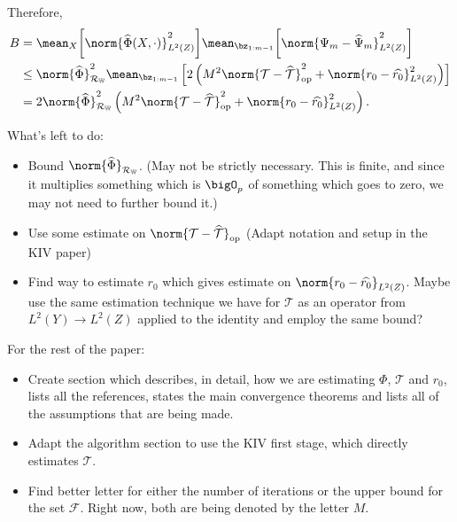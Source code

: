 \begin{itemize}
        Therefore,
        \begin{align*}
            B &= \mean_{ X } \bigg[
                \norm{ \hat{ \Phi } ( X, \cdot ) }_{ L^2 ( Z ) }^2
            \bigg]
            \mean_{ \bz_{ 1:m-1 } } \bigg[
                    \norm{ \Psi_{ m } - \hat{ \Psi }_{ m } }_{ L^2 ( Z ) }^2
            \bigg] \\
            &\leq \norm{ \hat{ \Phi } }_{ \mathcal{R}_{ \mathbb{W} } }^2
            \mean_{ \bz_{ 1:m-1 } } \left[
                2 \left(
                    M^2 \norm{ \mathcal{T} - \hat{ \mathcal{T} } }_{ \mathrm{op} }^2
                    + \norm{
                        r_{ 0 } - \hat{ r_{ 0 } }
                    }_{ L^{ 2 } ( Z ) }^2
                \right)
            \right] \\
            &= 2 \norm{ \hat{ \Phi } }_{ \mathcal{R}_{ \mathbb{W} } }^2
            \left(
                M^2 \norm{ \mathcal{T} - \hat{ \mathcal{T} } }_{ \mathrm{op} }^2
                + \norm{ r_{ 0 } - \hat{ r_{ 0 } } }_{ L^{ 2 } ( Z ) }^2
            \right)
        .\end{align*}
\end{itemize}

{\color{red}
    What's left to do:
    \begin{itemize}
        \item Bound $ \norm{ \hat{ \Phi } }_{ \mathcal{R}_{ \mathbb{W} } } $. (May not be strictly necessary. This is finite, and since it multiplies something which is $ \bigO_{ p } $ of something which goes to zero, we may not need to further bound it.) 

        \item Use some estimate on $ \norm{ \mathcal{T} - \hat{ \mathcal{T} } }_{ \mathrm{op} } $ (Adapt notation and setup in the KIV paper)

        \item Find way to estimate $ r_{ 0 } $ which gives estimate on $ \norm{ r_{ 0 } - \hat{ r_{ 0 } } }_{ L^{ 2 } ( Z ) } $.
            Maybe use the same estimation technique we have for $ \mathcal{T} $ as an operator from $ L^2 ( Y ) \to L^2 ( Z ) $ applied to the identity and employ the same bound?
    \end{itemize}
    For the rest of the paper:
    \begin{itemize}
        \item Create section which describes, in detail, how we are estimating $ \Phi $, $ \mathcal{T} $ and $ r_{ 0 } $, lists all the references, states the main convergence theorems and lists all of the assumptions that are being made.

        \item Adapt the algorithm section to use the KIV first stage, which directly estimates $ \mathcal{T} $.

        \item Find better letter for either the number of iterations or the upper bound for the set $ \mathcal{F} $.
            Right now, both are being denoted by the letter $ M $.
    \end{itemize}
}
